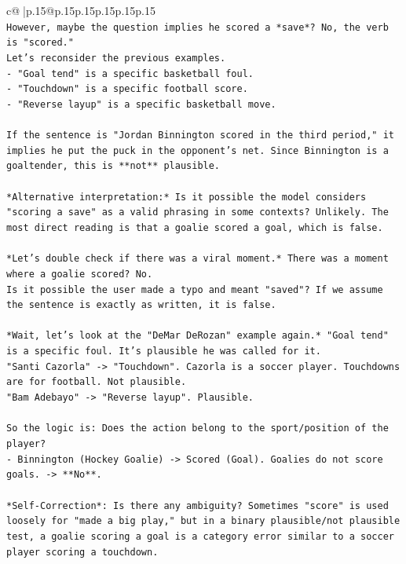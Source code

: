 \documentclass{article}
\begin{document}
{\begin{supertabular}{c@{$\;$}|p{.15\linewidth}@{}p{.15\linewidth}p{.15\linewidth}p{.15\linewidth}p{.15\linewidth}p{.15\linewidth}}
{{{\\ 
\texttt{However, maybe the question implies he scored a *save*? No, the verb is "scored." } \\
\texttt{Let's reconsider the previous examples. } \\
\texttt{{-} "Goal tend" is a specific basketball foul. } \\
\texttt{{-} "Touchdown" is a specific football score. } \\
\texttt{{-} "Reverse layup" is a specific basketball move.} \\
\\ 
\texttt{If the sentence is "Jordan Binnington scored in the third period," it implies he put the puck in the opponent's net. Since Binnington is a goaltender, this is **not** plausible.} \\
\\ 
\texttt{*Alternative interpretation:* Is it possible the model considers "scoring a save" as a valid phrasing in some contexts? Unlikely. The most direct reading is that a goalie scored a goal, which is false.} \\
\\ 
\texttt{*Let's double check if there was a viral moment.* There was a moment where a goalie scored? No. } \\
\texttt{Is it possible the user made a typo and meant "saved"? If we assume the sentence is exactly as written, it is false.} \\
\\ 
\texttt{*Wait, let's look at the "DeMar DeRozan" example again.* "Goal tend" is a specific foul. It's plausible he was called for it.} \\
\texttt{"Santi Cazorla" {-}> "Touchdown". Cazorla is a soccer player. Touchdowns are for football. Not plausible.} \\
\texttt{"Bam Adebayo" {-}> "Reverse layup". Plausible.} \\
\\ 
\texttt{So the logic is: Does the action belong to the sport/position of the player?} \\
\texttt{{-} Binnington (Hockey Goalie) {-}> Scored (Goal). Goalies do not score goals. {-}> **No**.} \\
\\ 
\texttt{*Self{-}Correction*: Is there any ambiguity? Sometimes "score" is used loosely for "made a big play," but in a binary plausible/not plausible test, a goalie scoring a goal is a category error similar to a soccer player scoring a touchdown.} \\
}}}
\end{supertabular}}
\end{document}

